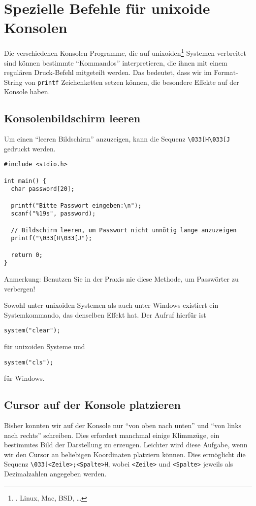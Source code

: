 \section{Spezielle Befehle für unixoide Konsolen}
Die verschiedenen Konsolen-Programme, die auf unixoiden\footnote{\ie. Linux, Mac, BSD, \ldots}  Systemen verbreitet sind können bestimmte \enquote{Kommandos} interpretieren, die ihnen mit einem regulären Druck-Befehl mitgeteilt werden. Das bedeutet, dass wir im Format-String von \texttt{printf} Zeichenketten setzen können, die besondere Effekte auf der Konsole haben.

\subsection{Konsolenbildschirm leeren}
Um einen \enquote{leeren Bildschirm} anzuzeigen, kann die Sequenz \texttt{\textbackslash 033[H\textbackslash 033[J} gedruckt werden.

\begin{codebox}
\begin{verbatim}
#include <stdio.h>

int main() {
  char password[20];
  
  printf("Bitte Passwort eingeben:\n");
  scanf("%19s", password);
  
  // Bildschirm leeren, um Passwort nicht unnötig lange anzuzeigen
  printf("\033[H\033[J");
  
  return 0;
}
\end{verbatim}
{\normalfont Anmerkung: Benutzen Sie in der Praxis nie diese Methode, um Passwörter zu verbergen!}
\end{codebox}

\begin{hintbox}
Sowohl unter unixoiden Systemen als auch unter Windows existiert ein Systemkommando, das denselben Effekt hat. Der Aufruf hierfür ist
\begin{center}
	\texttt{system("clear");}
\end{center}
für unixoiden Systeme und
\begin{center}
	\texttt{system("cls");}
\end{center}
für Windows.
\end{hintbox}

\subsection{Cursor auf der Konsole platzieren}
Bisher konnten wir auf der Konsole nur \enquote{von oben nach unten} und \enquote{von links nach rechts} schreiben. Dies erfordert manchmal einige Klimmzüge, ein bestimmtes Bild der Darstellung zu erzeugen. Leichter wird diese Aufgabe, wenn wir den Cursor an beliebigen Koordinaten platziern können. Dies ermöglicht die Sequenz \texttt{\textbackslash 033[<Zeile>;<Spalte>H}, wobei \texttt{<Zeile>} und \texttt{<Spalte>} jeweils als Dezimalzahlen angegeben werden.


